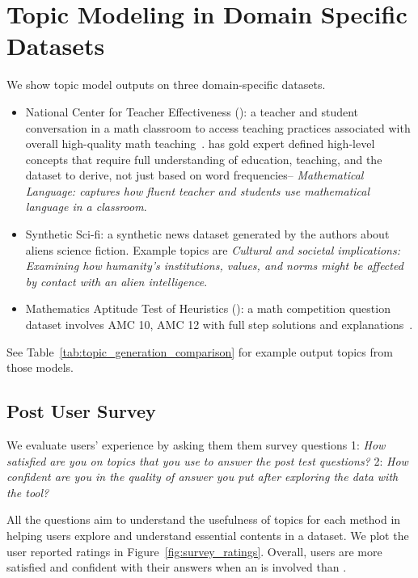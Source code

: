 \section{Topic Modeling in Domain Specific Datasets}
\label{sec:domain_specific_data}
We show topic model outputs on three domain-specific datasets.
%
\begin{itemize}
    \item National Center for Teacher Effectiveness (): a teacher and student conversation in a math classroom to access teaching practices associated with overall high-quality math teaching~\cite{xu2024promises}. 
     has gold expert defined high-level concepts that require full understanding of education, teaching, and the dataset to derive, not just based on word frequencies-- \textit{Mathematical Language: captures how fluent teacher and students use mathematical language in a classroom}.
    \item Synthetic Sci-fi: a synthetic news dataset generated by the authors about aliens science fiction. Example topics are \textit{Cultural and societal implications: Examining how humanity's institutions, values, and norms might be affected by contact with an alien intelligence}.
    \item Mathematics Aptitude Test of Heuristics (): a math competition question dataset involves AMC 10, AMC 12 with full step solutions and explanations~\cite{hendrycksmath2021}.
\end{itemize}

See Table~\ref{tab:topic_generation_comparison} for example output topics from those models.


\subsection{Post User Survey}
We evaluate users' experience by asking them them survey questions 1: \textit{How satisfied are you on topics that you use to answer the post test questions?} 2: \textit{How confident are you in the quality of answer you put after exploring the data with the tool?}

All the questions aim to understand the usefulness of topics for each method in helping users explore and understand essential contents in a dataset.
%
We plot the user reported ratings in Figure~\ref{fig:survey_ratings}. 
%
Overall, users are more satisfied and confident with their answers when an \mm{} is involved than .
%


